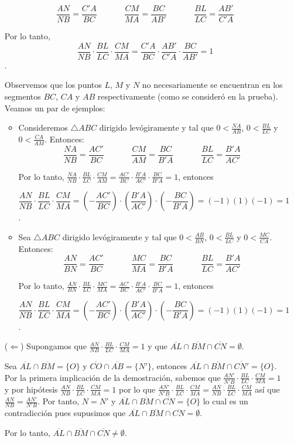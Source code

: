 \begin{dem}
\begin{enumerate}
$$\frac{AN}{NB}=\frac{C'A}{BC}\;\;\;\;\;\;\;\;\;\;\;\;\frac{CM}{MA}=\frac{BC}{AB'}\;\;\;\;\;\;\;\;\;\;\;\;\frac{BL}{LC}=\frac{AB'}{C'A}$$

Por lo tanto, $$\frac{AN}{NB}\cdot\frac{BL}{LC}\cdot\frac{CM}{MA}=\frac{C'A}{BC}\cdot\frac{AB'}{C'A}\cdot\frac{BC}{AB'}=1$$.

Observemos que los puntos $L$, $M$ y $N$ no necesariamente se encuentran en los segmentos $BC$, $CA$ y $AB$ respectivamente (como se consideró en la prueba). Veamos un par de ejemplos:

\begin{itemize}
\item Consideremos $\triangle ABC$ dirigido levógiramente y tal que $0<\frac{NA}{AB}$, $0<\frac{BL}{LC}$ y $0<\frac{CA}{AM}$. Entonces:
$$\frac{NA}{NB}=\frac{AC'}{BC}\;\;\;\;\;\;\;\;\;\;\;\;\frac{CM}{AM}=\frac{BC}{B'A}\;\;\;\;\;\;\;\;\;\;\;\;\frac{BL}{LC}=\frac{B'A}{AC'}$$

Por lo tanto, $\frac{NA}{NB}\cdot\frac{BL}{LC}\cdot\frac{CM}{AM}=\frac{AC'}{BC}\cdot\frac{B'A}{AC'}\cdot\frac{BC}{B'A}=1$, entonces

$$\frac{AN}{NB}\cdot\frac{BL}{LC}\cdot\frac{CM}{MA}=\left(-\frac{AC'}{BC}\right)\cdot\left(\frac{B'A}{AC'}\right)\cdot\left(-\frac{BC}{B'A}\right)=(-1)(1)(-1)=1$$.

\item Sea $\triangle ABC$ dirigido levógiramente y tal que $0<\frac{AB}{BN}$, $0<\frac{BL}{LC}$ y $0<\frac{MC}{CA}$. Entonces:
$$\frac{AN}{BN}=\frac{AC'}{BC}\;\;\;\;\;\;\;\;\;\;\;\;\frac{MC}{MA}=\frac{BC}{B'A}\;\;\;\;\;\;\;\;\;\;\;\;\frac{BL}{LC}=\frac{B'A}{AC'}$$

Por lo tanto, $\frac{AN}{BN}\cdot\frac{BL}{LC}\cdot\frac{MC}{MA}=\frac{AC'}{BC}\cdot\frac{B'A}{AC'}\cdot\frac{BC}{B'A}=1$, entonces

$$\frac{AN}{NB}\cdot\frac{BL}{LC}\cdot\frac{CM}{MA}=\left(-\frac{AC'}{BC}\right)\cdot\left(\frac{B'A}{AC'}\right)\cdot\left(-\frac{BC}{B'A}\right)=(-1)(1)(-1)=1$$.

\end{itemize}
\item [($\Leftarrow$)] Supongamos que $\frac{AN}{NB}\cdot\frac{BL}{LC}\cdot\frac{CM}{MA}=1$ y que  $\overline{AL}\cap\overline{BM}\cap\overline{CN}=\emptyset$. 

Sea $\overline{AL}\cap\overline{BM}=\{O\}$ y $\overline{CO}\cap\overline{AB}=\{N'\}$, entonces $\overline{AL}\cap\overline{BM}\cap\overline{CN'}=\{O\}$. Por la primera implicación de la demostración, sabemos que $\frac{AN'}{N'B}\cdot\frac{BL}{LC}\cdot\frac{CM}{MA}=1$ y por hipótesis $\frac{AN}{NB}\cdot\frac{BL}{LC}\cdot\frac{CM}{MA}=1$ por lo que $\frac{AN'}{N'B}\cdot\frac{BL}{LC}\cdot\frac{CM}{MA}=\frac{AN}{NB}\cdot\frac{BL}{LC}\cdot\frac{CM}{MA}$ así que $\frac{AN}{NB}=\frac{AN'}{N'B}$. Por tanto, $N=N'$ y $\overline{AL}\cap\overline{BM}\cap\overline{CN}=\{O\}$ lo cual es un contradicción pues supusimos que $\overline{AL}\cap\overline{BM}\cap\overline{CN}=\emptyset$. 

Por lo tanto, $\overline{AL}\cap\overline{BM}\cap\overline{CN}\neq\emptyset$. 
\end{enumerate}
\end{dem}


